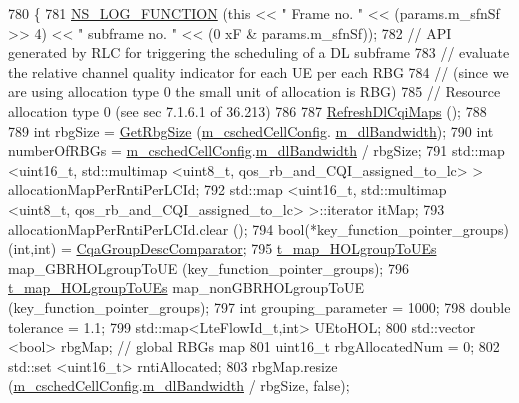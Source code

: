 \begin{DoxyCode}
780 \{
781   \hyperlink{log-macros-disabled_8h_a90b90d5bad1f39cb1b64923ea94c0761}{NS\_LOG\_FUNCTION} (\textcolor{keyword}{this} << \textcolor{stringliteral}{" Frame no. "} << (params.m\_sfnSf >> 4) << \textcolor{stringliteral}{" subframe no. "} << (0
      xF & params.m\_sfnSf));
782   \textcolor{comment}{// API generated by RLC for triggering the scheduling of a DL subframe}
783   \textcolor{comment}{// evaluate the relative channel quality indicator for each UE per each RBG}
784   \textcolor{comment}{// (since we are using allocation type 0 the small unit of allocation is RBG)}
785   \textcolor{comment}{// Resource allocation type 0 (see sec 7.1.6.1 of 36.213)}
786 
787   \hyperlink{classns3_1_1CqaFfMacScheduler_a2ea59028a05346722f37ccd70cafb248}{RefreshDlCqiMaps} ();
788 
789   \textcolor{keywordtype}{int} rbgSize = \hyperlink{classns3_1_1CqaFfMacScheduler_a1b57c878252b51347adcbbe5ca92f8c9}{GetRbgSize} (\hyperlink{classns3_1_1CqaFfMacScheduler_ad5dc768ca3a3c71671fd64de7de8ec00}{m\_cschedCellConfig}.
      \hyperlink{structns3_1_1FfMacCschedSapProvider_1_1CschedCellConfigReqParameters_ad18c695bd3c9d7f742ba1dab4a941e8a}{m\_dlBandwidth});
790   \textcolor{keywordtype}{int} numberOfRBGs = \hyperlink{classns3_1_1CqaFfMacScheduler_ad5dc768ca3a3c71671fd64de7de8ec00}{m\_cschedCellConfig}.\hyperlink{structns3_1_1FfMacCschedSapProvider_1_1CschedCellConfigReqParameters_ad18c695bd3c9d7f742ba1dab4a941e8a}{m\_dlBandwidth} / rbgSize;
791   std::map <uint16\_t, std::multimap <uint8\_t, qos\_rb\_and\_CQI\_assigned\_to\_lc> > allocationMapPerRntiPerLCId;
792   std::map <uint16\_t, std::multimap <uint8\_t, qos\_rb\_and\_CQI\_assigned\_to\_lc> >::iterator itMap;
793   allocationMapPerRntiPerLCId.clear ();
794   bool(*key\_function\_pointer\_groups)(int,int) = \hyperlink{namespacens3_af9e1b18e690a42c20297a79e60269ea7}{CqaGroupDescComparator};
795   \hyperlink{namespacens3_a92550c655e7599f3bc33c3ce363efc7a}{t\_map\_HOLgroupToUEs} map\_GBRHOLgroupToUE (key\_function\_pointer\_groups);
796   \hyperlink{namespacens3_a92550c655e7599f3bc33c3ce363efc7a}{t\_map\_HOLgroupToUEs} map\_nonGBRHOLgroupToUE (key\_function\_pointer\_groups);
797   \textcolor{keywordtype}{int} grouping\_parameter = 1000;
798   \textcolor{keywordtype}{double} tolerance = 1.1;
799   std::map<LteFlowId\_t,int> UEtoHOL;
800   std::vector <bool> rbgMap;  \textcolor{comment}{// global RBGs map}
801   uint16\_t rbgAllocatedNum = 0;
802   std::set <uint16\_t> rntiAllocated;
803   rbgMap.resize (\hyperlink{classns3_1_1CqaFfMacScheduler_ad5dc768ca3a3c71671fd64de7de8ec00}{m\_cschedCellConfig}.\hyperlink{structns3_1_1FfMacCschedSapProvider_1_1CschedCellConfigReqParameters_ad18c695bd3c9d7f742ba1dab4a941e8a}{m\_dlBandwidth} / rbgSize, \textcolor{keyword}{false});

\end{DoxyCode}
